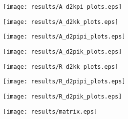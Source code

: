 \documentclass[11pt,a4paper]{article}
\begin{document}
\texttt{[image: results/A\_d2kpi\_plots.eps]}

\texttt{[image: results/A\_d2kk\_plots.eps]}

\texttt{[image: results/A\_d2pipi\_plots.eps]}

\texttt{[image: results/A\_d2pik\_plots.eps]}

\texttt{[image: results/R\_d2kk\_plots.eps]}

\texttt{[image: results/R\_d2pipi\_plots.eps]}

\texttt{[image: results/R\_d2pik\_plots.eps]}

\clearpage
\texttt{[image: results/matrix.eps]}
\end{document}
